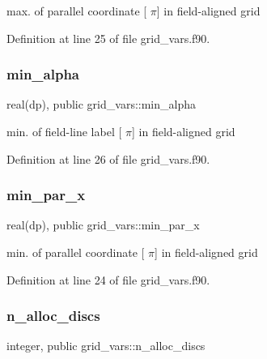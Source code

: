 max. of parallel coordinate \mbox{[} $\pi$\mbox{]} in field-\/aligned grid 



Definition at line 25 of file grid\+\_\+vars.\+f90.

\mbox{\label{namespacegrid__vars_ad6f74227054278479670c68d8950e0e2}} 
\subsubsection{\texorpdfstring{min\+\_\+alpha}{min\_alpha}}
{\footnotesize\ttfamily real(dp), public grid\+\_\+vars\+::min\+\_\+alpha}



min. of field-\/line label \mbox{[} $\pi$\mbox{]} in field-\/aligned grid 



Definition at line 26 of file grid\+\_\+vars.\+f90.

\mbox{\label{namespacegrid__vars_a689c08cf03bc54338878f85c6429b856}} 
\subsubsection{\texorpdfstring{min\+\_\+par\+\_\+x}{min\_par\_x}}
{\footnotesize\ttfamily real(dp), public grid\+\_\+vars\+::min\+\_\+par\+\_\+x}



min. of parallel coordinate \mbox{[} $\pi$\mbox{]} in field-\/aligned grid 



Definition at line 24 of file grid\+\_\+vars.\+f90.

\mbox{\label{namespacegrid__vars_a23b5e4789dc5d3d0d6dadeb47909ddbd}} 
\subsubsection{\texorpdfstring{n\+\_\+alloc\+\_\+discs}{n\_alloc\_discs}}
{\footnotesize\ttfamily integer, public grid\+\_\+vars\+::n\+\_\+alloc\+\_\+discs}



